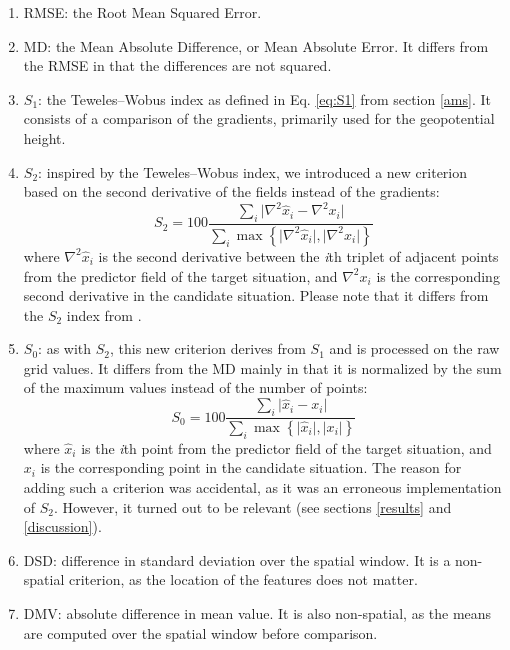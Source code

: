 \documentclass[draft]{agujournal2019}
\begin{document}
\begin{enumerate}
	\item RMSE: the Root Mean Squared Error.
	\item MD: the Mean Absolute Difference, or Mean Absolute Error. It differs from the RMSE in that the differences are not squared.
	\item $S_{1}$: the Teweles--Wobus index as defined in Eq. \ref{eq:S1} from section \ref{ams}. It consists of a comparison of the gradients, primarily used for the geopotential height.
	\item $S_{2}$: inspired by the Teweles--Wobus index, we introduced a new criterion based on the second derivative of the fields instead of the gradients:
	\begin{equation}
		\label{eq:S2}
		S_{2}=100 \frac {\displaystyle 
            \sum_{i} \vert \nabla^{2}\hat{x}_{i} - 
            \nabla^{2} x_{i} \vert
        }
		{\displaystyle 
            \sum_{i} \max\left\lbrace 
                \vert \nabla^{2}\hat{x}_{i} \vert , 
                \vert \nabla^{2} x_{i} \vert 
            \right\rbrace 
        }
	\end{equation}
	where $\nabla^{2} \hat{x}_{i}$ is the second derivative between the \textit{i}th triplet of adjacent points from the predictor field of the target situation, and $\nabla^{2} x_{i}$ is the corresponding second derivative in the candidate situation.
 Please note that it differs from the $S_{2}$ index from .
	\item $S_{0}$: as with $S_{2}$, this new criterion derives from $S_{1}$ and is processed on the raw grid values. It differs from the MD mainly in that it is normalized by the sum of the maximum values instead of the number of points:
	\begin{equation}
		\label{eq:S0}
		S_{0}=100 \frac {\displaystyle 
            \sum_{i} \vert \hat{x}_{i} - 
            x_{i} \vert
        }
		{\displaystyle 
            \sum_{i} \max\left\lbrace 
                \vert \hat{x}_{i} \vert , 
                \vert x_{i} \vert 
            \right\rbrace 
        }
	\end{equation}
	where $\hat{x}_{i}$ is the \textit{i}th point from the predictor field of the target situation, and $x_{i}$ is the corresponding point in the candidate situation. The reason for adding such a criterion was accidental, as it was an erroneous implementation of $S_{2}$. However, it turned out to be relevant (see sections \ref{results} and \ref{discussion}).
	\item DSD: difference in standard deviation over the spatial window. It is a non-spatial criterion, as the location of the features does not matter.
	\item DMV: absolute difference in mean value. It is also non-spatial, as the means are computed over the spatial window before comparison.
\end{enumerate}
\end{document}
